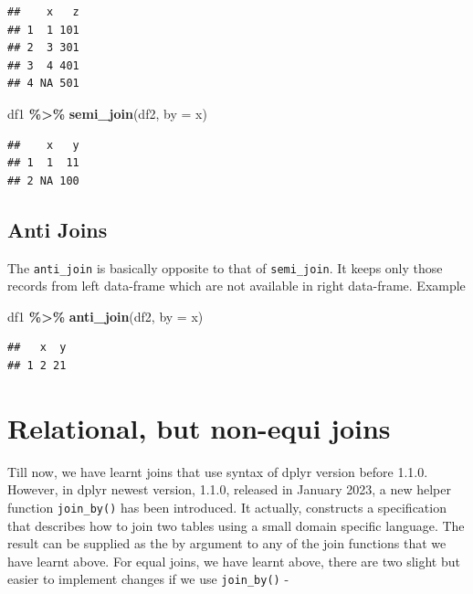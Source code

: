 \documentclass[
]{book}
\newenvironment{Shaded}{\begin{snugshade}}{\end{snugshade}}
\newcommand{\AttributeTok}[1]{\textcolor[rgb]{0.13,0.29,0.53}{#1}}
\newcommand{\FunctionTok}[1]{\textcolor[rgb]{0.13,0.29,0.53}{\textbf{#1}}}
\newcommand{\NormalTok}[1]{#1}
\newcommand{\SpecialCharTok}[1]{\textcolor[rgb]{0.81,0.36,0.00}{\textbf{#1}}}
\newcommand{\StringTok}[1]{\textcolor[rgb]{0.31,0.60,0.02}{#1}}
\begin{document}
\begin{verbatim}
##    x   z
## 1  1 101
## 2  3 301
## 3  4 401
## 4 NA 501
\end{verbatim}

\begin{Shaded}
\begin{Highlighting}[]
\NormalTok{df1 }\SpecialCharTok{\%\textgreater{}\%} \FunctionTok{semi\_join}\NormalTok{(df2, }\AttributeTok{by =} \StringTok{\textquotesingle{}x\textquotesingle{}}\NormalTok{)}
\end{Highlighting}
\end{Shaded}

\begin{verbatim}
##    x   y
## 1  1  11
## 2 NA 100
\end{verbatim}

\hypertarget{anti-joins}{%
\subsection{Anti Joins}\label{anti-joins}}

The \texttt{anti\_join} is basically opposite to that of \texttt{semi\_join}. It keeps only those records from left data-frame which are not available in right data-frame. Example

\begin{Shaded}
\begin{Highlighting}[]
\NormalTok{df1 }\SpecialCharTok{\%\textgreater{}\%} \FunctionTok{anti\_join}\NormalTok{(df2, }\AttributeTok{by =} \StringTok{\textquotesingle{}x\textquotesingle{}}\NormalTok{)}
\end{Highlighting}
\end{Shaded}

\begin{verbatim}
##   x  y
## 1 2 21
\end{verbatim}

\hypertarget{relational-but-non-equi-joins}{%
\section{Relational, but non-equi joins}\label{relational-but-non-equi-joins}}

Till now, we have learnt joins that use syntax of dplyr version before 1.1.0. However, in dplyr newest version, 1.1.0, released in January 2023, a new helper function \texttt{join\_by()} has been introduced. It actually, constructs a specification that describes how to join two tables using a small domain specific language. The result can be supplied as the by argument to any of the join functions that we have learnt above. For equal joins, we have learnt above, there are two slight but easier to implement changes if we use \texttt{join\_by()} -
\end{document}
